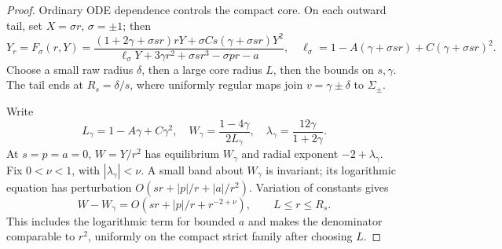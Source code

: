 \begin{proof}
Ordinary ODE dependence controls the compact core. On each outward tail,
set \(X=\sigma r\), \(\sigma=\pm1\); then
\begin{equation}\label{eq:parabolic-tail}
 Y_r=F_\sigma(r,Y)=
 \frac{(1+2\gamma+\sigma sr)rY+
       \sigma Cs(\gamma+\sigma sr)Y^2}
 {\ell_\sigma Y+3\gamma r^2+\sigma sr^3-\sigma pr-a},
 \quad
 \ell_\sigma=1-A(\gamma+\sigma sr)+C(\gamma+\sigma sr)^2 .
\end{equation}
Choose a small raw radius \(\delta\), then a large core radius \(L\),
then the bounds on \(s,\gamma\). The tail ends at \(R_s=\delta/s\),
where uniformly regular maps join \(v=\gamma\pm\delta\) to \(\Sigma_\pm\).

Write
\[
 L_\gamma=1-A\gamma+C\gamma^2,\quad
 W_\gamma=\frac{1-4\gamma}{2L_\gamma},\quad
 \lambda_\gamma=\frac{12\gamma}{1+2\gamma}.
\]
At \(s=p=a=0\), \(W=Y/r^2\) has equilibrium \(W_\gamma\)
and radial exponent \(-2+\lambda_\gamma\).
Fix \(0<\nu<1\), with \(|\lambda_\gamma|<\nu\). A small band about
\(W_\gamma\) is invariant; its logarithmic equation has perturbation
\(O(sr+|p|/r+|a|/r^2)\). Variation of constants gives
\begin{equation}\label{eq:parabolic-corridor}
 W-W_\gamma=O(sr+|p|/r+r^{-2+\nu}),\qquad L\le r\le R_s .
\end{equation}
This includes the logarithmic term for bounded \(a\) and makes the
denominator comparable to \(r^2\), uniformly on the compact strict family
after choosing \(L\).


\end{proof}
